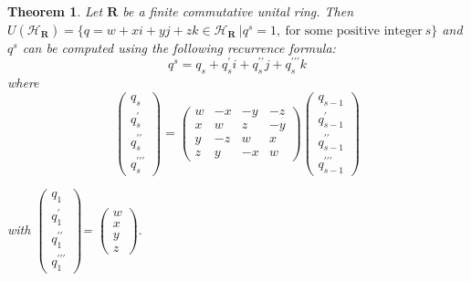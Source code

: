 \documentclass[sn-mathphys,Numbered]{sn-jnl}%
\theoremstyle{thmstyleone}
\newtheorem{theorem}{Theorem}
\theoremstyle{thmstyletwo}
\theoremstyle{thmstylethree}
\begin{document}
\begin{theorem} \label{t1}
Let $\mathbf{R}$ be a finite commutative unital ring. Then $U(\mathcal{H_{\mathbf{R}}})=\{ q=w+xi+yj+zk \in \mathcal{H_{\mathbf{R}}} \ | q^{s}=1, \ \text{for some positive integer} \ s \}$ and $q^{s}$ can be computed using the following recurrence formula:\\
$$q^{s}=q_{s}+q_{s}^{\prime}i+q_{s}^{\prime \prime}j+q_{s}^{\prime \prime \prime }k $$ where \\
 
 $$ \left( \begin{array}{c}
 q_{s} \\
 q_{s}^{\prime} \\
 q_{s}^{\prime \prime} \\
 q_{s}^{\prime \prime \prime }
 \end{array}\right)
 = \left(\begin{array}{cccc} 
w & -x & -y& -z \\
x & w & z & -y \\
y & -z & w & x \\
z & y & -x & w 
\end{array} \right)
 \left( \begin{array}{c}
 q_{s-1} \\
 q_{s-1}^{\prime} \\
 q_{s-1}^{\prime \prime} \\
 q_{s-1}^{\prime \prime \prime }
 
 
  \end{array}\right)$$

 with  
$\left( \begin{array}{c}
 q_{1} \\
 q_{1}^{\prime} \\
 q_{1}^{\prime \prime} \\
 q_{1}^{\prime \prime \prime }
 
 
  \end{array}\right)$= $\left( \begin{array}{c}
 w \\
 x\\
 y \\
 z
 
 
  \end{array}\right).$
  
\end{theorem}
\end{document}

